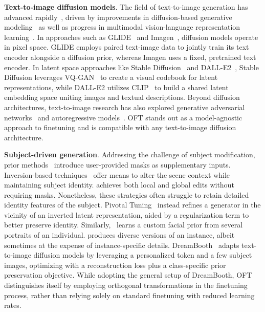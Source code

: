 \textbf{Text-to-image diffusion models}. The field of text-to-image generation has advanced rapidly~\cite{saharia2022photorealistic,ramesh2022hierarchical,rombach2022high,gu2022vector,nichol2022glide}, driven by improvements in diffusion-based generative modeling~\cite{ho2020denoising,song2021score,song2021denoising,dhariwal2021diffusion} as well as progress in multimodal vision-language representation learning~\cite{su2020vlbert,lu2019vilbert,radford2021learning,wang2021simvlm,li2022blip,li2023blip,alayrac2022flamingo,schuhmann2022laion}. In approaches such as GLIDE~\cite{nichol2022glide} and Imagen~\cite{saharia2022photorealistic}, diffusion models operate in pixel space. GLIDE employs paired text-image data to jointly train its text encoder alongside a diffusion prior, whereas Imagen uses a fixed, pretrained text encoder. In latent space approaches like Stable Diffusion~\cite{rombach2022high} and DALL-E2~\cite{ramesh2022hierarchical}, Stable Diffusion leverages VQ-GAN~\cite{esser2021taming} to create a visual codebook for latent representations, while DALL-E2 utilizes CLIP~\cite{radford2021learning} to build a shared latent embedding space uniting images and textual descriptions. Beyond diffusion architectures, text-to-image research has also explored generative adversarial networks~\cite{reed2016generative,zhang2017stackgan,xu2018attngan,li2019controllable} and autoregressive models~\cite{ramesh2021zero,ding2021cogview,wu2022nuwa,yuscaling}. OFT stands out as a model-agnostic approach to finetuning and is compatible with any text-to-image diffusion architecture.

\textbf{Subject-driven generation}. Addressing the challenge of subject modification, prior methods~\cite{avrahami2022blended,nichol2022glide} introduce user-provided masks as supplementary inputs. Inversion-based techniques~\cite{choi2021ilvr,dhariwal2021diffusion,ramesh2022hierarchical,gal2022image} offer means to alter the scene context while maintaining subject identity. \cite{hertz2022prompt} achieves both local and global edits without requiring masks. Nonetheless, these strategies often struggle to retain detailed identity features of the subject. Pivotal Tuning~\cite{roich2022pivotal} instead refines a generator in the vicinity of an inverted latent representation, aided by a regularization term to better preserve identity. Similarly,~\cite{nitzan2022mystyle} learns a custom facial prior from several portraits of an individual. \cite{casanova2021instance} produces diverse versions of an instance, albeit sometimes at the expense of instance-specific details. DreamBooth~\cite{ruiz2023dreambooth} adapts text-to-image diffusion models by leveraging a personalized token and a few subject images, optimizing with a reconstruction loss plus a class-specific prior preservation objective. While adopting the general setup of DreamBooth, OFT distinguishes itself by employing orthogonal transformations in the finetuning process, rather than relying solely on standard finetuning with reduced learning rates.

